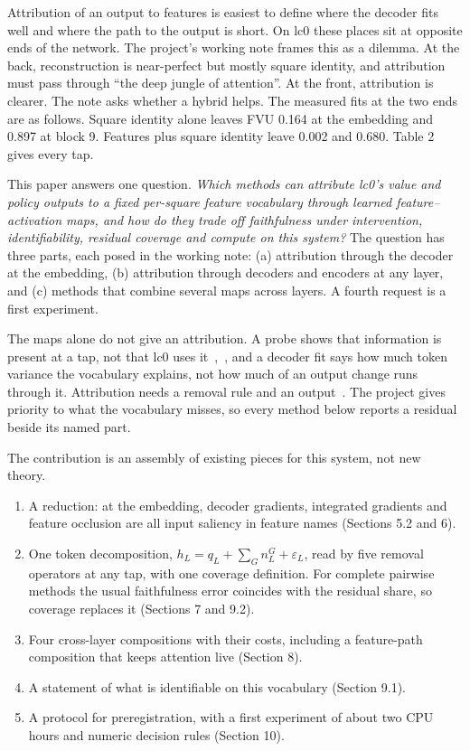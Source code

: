 \documentclass[conference]{IEEEtran}
\begin{document}
Attribution of an output to features is easiest to define where the decoder fits well and where the path to the output is short. On lc0 these places sit at opposite ends of the network. The project's working note frames this as a dilemma. At the back, reconstruction is near-perfect but mostly square identity, and attribution must pass through ``the deep jungle of attention''. At the front, attribution is clearer. The note asks whether a hybrid helps. The measured fits at the two ends are as follows. Square identity alone leaves FVU 0.164 at the embedding and 0.897 at block 9. Features plus square identity leave 0.002 and 0.680. Table 2 gives every tap.

This paper answers one question. \emph{Which methods can attribute lc0's value and policy outputs to a fixed per-square feature vocabulary through learned feature--activation maps, and how do they trade off faithfulness under intervention, identifiability, residual coverage and compute on this system?} The question has three parts, each posed in the working note: (a) attribution through the decoder at the embedding, (b) attribution through decoders and encoders at any layer, and (c) methods that combine several maps across layers. A fourth request is a first experiment.

The maps alone do not give an attribution. A probe shows that information is present at a tap, not that lc0 uses it~\cite{ravichander2021},~\cite{elazar2021}, and a decoder fit says how much token variance the vocabulary explains, not how much of an output change runs through it. Attribution needs a removal rule and an output~\cite{covert2021}. The project gives priority to what the vocabulary misses, so every method below reports a residual beside its named part.

The contribution is an assembly of existing pieces for this system, not new theory.

\begin{enumerate}
\item A reduction: at the embedding, decoder gradients, integrated gradients and feature occlusion are all input saliency in feature names (Sections 5.2 and 6).
\item One token decomposition, $h_L=q_L+\sum_G n^G_L+\varepsilon_L$, read by five removal operators at any tap, with one coverage definition. For complete pairwise methods the usual faithfulness error coincides with the residual share, so coverage replaces it (Sections 7 and 9.2).
\item Four cross-layer compositions with their costs, including a feature-path composition that keeps attention live (Section 8).
\item A statement of what is identifiable on this vocabulary (Section 9.1).
\item A protocol for preregistration, with a first experiment of about two CPU hours and numeric decision rules (Section 10).
\end{enumerate}
\end{document}
